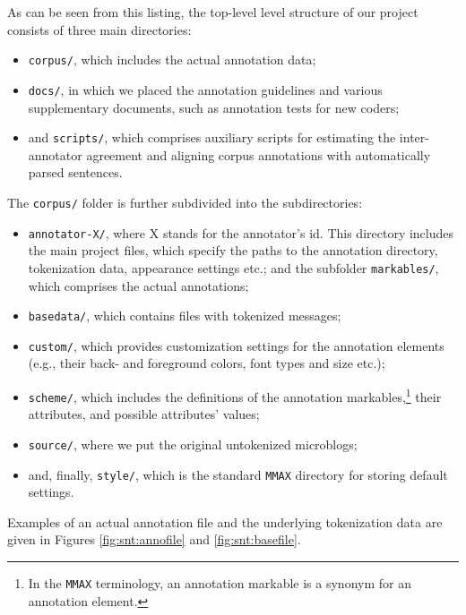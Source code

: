 As can be seen from this listing, the top-level level structure of our
project consists of three main directories:
\begin{itemize}
\item\texttt{corpus/}, which includes the actual annotation data;

\item\texttt{docs/}, in which we placed the annotation guidelines and
  various supplementary documents, such as annotation tests for new
  coders;

\item and \texttt{scripts/}, which comprises auxiliary scripts for
  estimating the inter-annotator agreement and aligning corpus
  annotations with automatically parsed sentences.
\end{itemize}

The \texttt{corpus/} folder is further subdivided into the
subdirectories:

\begin{itemize}
\item\texttt{annotator-X/}, where X stands for the annotator's id.
  This directory includes the main project files, which specify the
  paths to the annotation directory, tokenization data, appearance
  settings etc.; and the subfolder \texttt{markables/}, which
  comprises the actual annotations;

\item\texttt{basedata/}, which contains files with tokenized messages;

\item\texttt{custom/}, which provides customization settings for the
  annotation elements (e.g., their back- and foreground colors, font
  types and size etc.);

\item\texttt{scheme/}, which includes the definitions of the
  annotation markables,\footnote{In the \texttt{MMAX} terminology, an
    annotation markable is a synonym for an annotation element.}
  their attributes, and possible attributes' values;

\item\texttt{source/}, where we put the original untokenized
  microblogs;

\item and, finally, \texttt{style/}, which is the standard
  \texttt{MMAX} directory for storing default settings.
\end{itemize}

Examples of an actual annotation file and the underlying tokenization
data are given in Figures \ref{fig:snt:annofile} and
\ref{fig:snt:basefile}.

